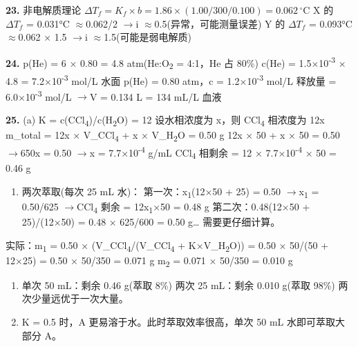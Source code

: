 \documentclass[a4paper,11pt]{ctexart}
\providecommand{\tightlist}{\setlength{\itemsep}{0pt}\setlength{\parskip}{0pt}}
\newcommand{\箭}{\ensuremath{\rightarrow}}
\newcommand{\左箭}{\ensuremath{\leftarrow}}
\newcommand{\上箭}{\ensuremath{\uparrow}}
\newcommand{\下箭}{\ensuremath{\downarrow}}
\newcommand{\衡}{\ensuremath{\rightleftharpoons}}
\newcommand{\双箭}{\ensuremath{\leftrightarrow}}
\newcommand{\约等于}{\ensuremath{\approx}}
\newcommand{\小于等于}{\ensuremath{\leq}}
\newcommand{\大于等于}{\ensuremath{\geq}}
\newcommand{\不等于}{\ensuremath{\neq}}
\newcommand{\西格马}{\ensuremath{\sigma}}
\newcommand{\派}{\ensuremath{\pi}}
\begin{document}
\textbf{23.} 非电解质理论 \(\Delta T_f = K_f \times b = 1.86 \times (1.00/300/0.100) = 0.062\,^\circ\mathrm{C}\)
X 的 \(\Delta T_f\) = 0.031°C \约等于 0.062/2 \箭 i \约等于 0.5(异常，可能测量误差)
Y 的 \(\Delta T_f\) = 0.093°C \约等于 0.062 × 1.5 \箭 i \约等于 1.5(可能是弱电解质)

\textbf{24.} p(He) = 6 × 0.80 = 4.8 atm(He:O\textsubscript{2} = 4:1，He 占 80\%)
c(He) = 1.5×10\textsuperscript{-3} × 4.8 = 7.2×10\textsuperscript{-3} mol/L
水面 p(He) = 0.80 atm，c = 1.2×10\textsuperscript{-3} mol/L
释放量 = 6.0×10\textsuperscript{-3} mol/L \箭 V = 0.134 L = 134 mL/L 血液

\textbf{25.}
(a) K = c(CCl\textsubscript{4})/c(H\textsubscript{2}O) = 12
设水相浓度为 x，则 CCl\textsubscript{4} 相浓度为 12x
m\_total = 12x × V\_CCl\textsubscript{4} + x × V\_H\textsubscript{2}O = 0.50 g
12x × 50 + x × 50 = 0.50 \箭 650x = 0.50 \箭 x = 7.7×10\textsuperscript{-4} g/mL
CCl\textsubscript{4} 相剩余 = 12 × 7.7×10\textsuperscript{-4} × 50 = 0.46 g

\begin{enumerate}
\def\labelenumi{(\alph{enumi})}
\setcounter{enumi}{1}
\tightlist
\item
  两次萃取(每次 25 mL 水)：
  第一次：x\textsubscript{1}(12×50 + 25) = 0.50 \箭 x\textsubscript{1} = 0.50/625 \箭 CCl\textsubscript{4} 剩余 = 12x\textsubscript{1}×50 = 0.48 g
  第二次：0.48(12×50 + 25)/(12×50) = 0.48 × 625/600 = 0.50 g\ldots{} 需要更仔细计算。
\end{enumerate}

实际：m\textsubscript{1} = 0.50 × (V\_CCl\textsubscript{4}/(V\_CCl\textsubscript{4} + K×V\_H\textsubscript{2}O)) = 0.50 × 50/(50 + 12×25) = 0.50 × 50/350 = 0.071 g
m\textsubscript{2} = 0.071 × 50/350 = 0.010 g

\begin{enumerate}
\def\labelenumi{(\alph{enumi})}
\setcounter{enumi}{2}
\item
  单次 50 mL：剩余 0.46 g(萃取 8\%)
  两次 25 mL：剩余 0.010 g(萃取 98\%)
  两次少量远优于一次大量。
\item
  K = 0.5 时，A 更易溶于水。此时萃取效率很高，单次 50 mL 水即可萃取大部分 A。
\end{enumerate}
\end{document}
